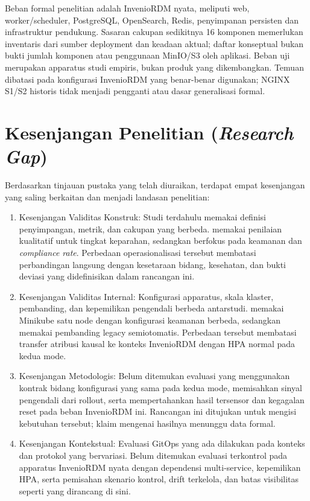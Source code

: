 Beban formal penelitian adalah InvenioRDM nyata, meliputi web, worker/scheduler, PostgreSQL, OpenSearch, Redis, penyimpanan persisten dan infrastruktur pendukung. Sasaran cakupan sedikitnya 16 komponen memerlukan inventaris dari sumber deployment dan keadaan aktual; daftar konseptual bukan bukti jumlah komponen atau penggunaan MinIO/S3 oleh aplikasi. Beban uji merupakan apparatus studi empiris, bukan produk yang dikembangkan. Temuan dibatasi pada konfigurasi InvenioRDM yang benar-benar digunakan; NGINX S1/S2 historis tidak menjadi pengganti atau dasar generalisasi formal.

\section{Kesenjangan Penelitian (\textit{Research Gap})}

Berdasarkan tinjauan pustaka yang telah diuraikan, terdapat empat kesenjangan yang saling berkaitan dan menjadi landasan penelitian:

\begin{enumerate}
  \item Kesenjangan Validitas Konstruk: Studi terdahulu memakai definisi penyimpangan, metrik, dan cakupan yang berbeda. \citet{shrestha2024configuration} memakai penilaian kualitatif untuk tingkat keparahan, sedangkan \citet{kaggantinataraja2025security} berfokus pada keamanan dan \textit{compliance rate}. Perbedaan operasionalisasi tersebut membatasi perbandingan langsung dengan kesetaraan bidang, kesehatan, dan bukti deviasi yang didefinisikan dalam rancangan ini.

  \item Kesenjangan Validitas Internal: Konfigurasi apparatus, skala klaster, pembanding, dan kepemilikan pengendali berbeda antarstudi. \citet{kaggantinataraja2025security} memakai Minikube satu node dengan konfigurasi keamanan berbeda, sedangkan \citet{matubber2025managing} memakai pembanding legacy semiotomatis. Perbedaan tersebut membatasi transfer atribusi kausal ke konteks InvenioRDM dengan HPA normal pada kedua mode.

  \item Kesenjangan Metodologis: Belum ditemukan evaluasi yang menggunakan kontrak bidang konfigurasi yang sama pada kedua mode, memisahkan sinyal pengendali dari rollout, serta mempertahankan hasil tersensor dan kegagalan reset pada beban InvenioRDM ini. Rancangan ini ditujukan untuk mengisi kebutuhan tersebut; klaim mengenai hasilnya menunggu data formal.

  \item Kesenjangan Kontekstual: Evaluasi GitOps yang ada dilakukan pada konteks dan protokol yang bervariasi. Belum ditemukan evaluasi terkontrol pada apparatus InvenioRDM nyata dengan dependensi multi-service, kepemilikan HPA, serta pemisahan skenario kontrol, drift terkelola, dan batas visibilitas seperti yang dirancang di sini.
\end{enumerate}

